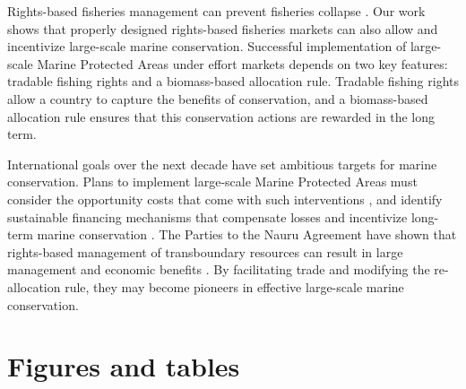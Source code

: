 \documentclass[12pt]{article}
\begin{document}
Rights-based fisheries management can prevent fisheries collapse \cite{costello_2008}. Our work shows that properly designed rights-based fisheries markets can also allow and incentivize large-scale marine conservation. Successful implementation of large-scale Marine Protected Areas under effort markets depends on two key features: tradable fishing rights and a biomass-based allocation rule. Tradable fishing rights allow a country to capture the benefits of conservation, and a biomass-based allocation rule ensures that this conservation actions are rewarded in the long term.

International goals over the next decade have set ambitious targets for marine conservation. Plans to implement large-scale Marine Protected Areas must consider the opportunity costs that come with such interventions \cite{smith_2010}, and identify sustainable financing mechanisms that compensate losses and incentivize long-term marine conservation \cite{mallin_2019}. The Parties to the Nauru Agreement have shown that rights-based management of transboundary resources can result in large management and economic benefits \cite{havice_2013,aqorau_2018}. By facilitating trade and modifying the re-allocation rule, they may become pioneers in effective large-scale marine conservation.





\clearpage

\FloatBarrier

\section*{Figures and tables}
\end{document}

